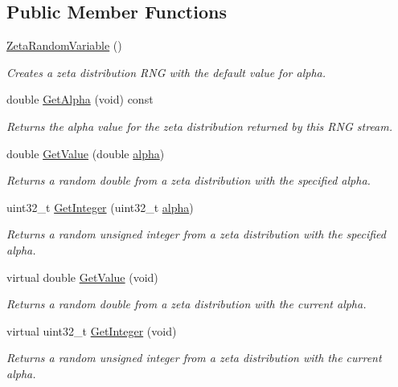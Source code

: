 \subsection*{Public Member Functions}
\begin{DoxyCompactItemize}
\item 
\hyperlink{classns3_1_1ZetaRandomVariable_aa8c68cfbbb24a0afc00b5aca373dca5d}{Zeta\+Random\+Variable} ()
\begin{DoxyCompactList}\small\item\em Creates a zeta distribution R\+NG with the default value for alpha. \end{DoxyCompactList}\item 
double \hyperlink{classns3_1_1ZetaRandomVariable_a8cc1963b49d0fc26ed7a4589cb55c813}{Get\+Alpha} (void) const 
\begin{DoxyCompactList}\small\item\em Returns the alpha value for the zeta distribution returned by this R\+NG stream. \end{DoxyCompactList}\item 
double \hyperlink{classns3_1_1ZetaRandomVariable_a8ab47b42912943fe4eea82bdd250d42a}{Get\+Value} (double \hyperlink{lte__uplink__power__control_8m_a62197192f0fbf4e0675eb37be1c4c175}{alpha})
\begin{DoxyCompactList}\small\item\em Returns a random double from a zeta distribution with the specified alpha. \end{DoxyCompactList}\item 
uint32\+\_\+t \hyperlink{classns3_1_1ZetaRandomVariable_acd5c516f3f7abe8775675b67abda3a65}{Get\+Integer} (uint32\+\_\+t \hyperlink{lte__uplink__power__control_8m_a62197192f0fbf4e0675eb37be1c4c175}{alpha})
\begin{DoxyCompactList}\small\item\em Returns a random unsigned integer from a zeta distribution with the specified alpha. \end{DoxyCompactList}\item 
virtual double \hyperlink{classns3_1_1ZetaRandomVariable_aaebcf45aaadc58780727287d98779d2f}{Get\+Value} (void)
\begin{DoxyCompactList}\small\item\em Returns a random double from a zeta distribution with the current alpha. \end{DoxyCompactList}\item 
virtual uint32\+\_\+t \hyperlink{classns3_1_1ZetaRandomVariable_a7355f32a91c2aa7567f815cce60b84be}{Get\+Integer} (void)
\begin{DoxyCompactList}\small\item\em Returns a random unsigned integer from a zeta distribution with the current alpha. \end{DoxyCompactList}\end{DoxyCompactItemize}
